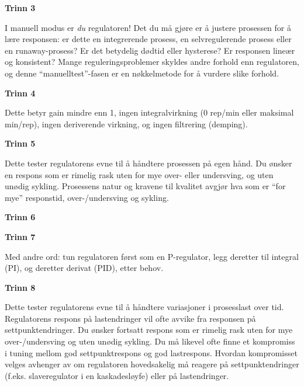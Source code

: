 \vskip 10pt

\noindent
{\bf Trinn 3}

 I manuell modus er {\it du} regulatoren! Det du må gjøre er å justere prosessen for å lære responsen: er dette en integrerende prosess, en selvregulerende prosess eller en runaway-prosess? Er det betydelig dødtid eller hysterese? Er responsen lineær og konsistent? Mange reguleringsproblemer skyldes andre forhold enn regulatoren, og denne ``manuelltest''-fasen er en nøkkelmetode for å vurdere slike forhold.

\vskip 10pt

\noindent
{\bf Trinn 4}

 Dette betyr gain mindre enn 1, ingen integralvirkning (0 rep/min eller maksimal min/rep), ingen deriverende virkning, og ingen filtrering (demping).

\vskip 10pt

\noindent
{\bf Trinn 5}

 Dette tester regulatorens evne til å håndtere prosessen på egen hånd. Du ønsker en respons som er rimelig rask uten for mye over- eller undersving, og uten unødig sykling. Prosessens natur og kravene til kvalitet avgjør hva som er ``for mye'' responstid, over-/undersving og sykling.

\vskip 10pt

\noindent
{\bf Trinn 6}


\vskip 10pt

\noindent
{\bf Trinn 7}

 Med andre ord: tun regulatoren først som en P-regulator, legg deretter til integral (PI), og deretter derivat (PID), etter behov.

\filbreak

\vskip 10pt

\noindent
{\bf Trinn 8}

 Dette tester regulatorens evne til å håndtere variasjoner i prosesslast over tid. Regulatorens respons på lastendringer vil ofte avvike fra responsen på settpunktendringer. Du ønsker fortsatt respons som er rimelig rask uten for mye over-/undersving og uten unødig sykling. Du må likevel ofte finne et kompromiss i tuning mellom god settpunktrespons og god lastrespons. Hvordan kompromisset velges avhenger av om regulatoren hovedsakelig må reagere på settpunktendringer (f.eks. slaveregulator i en kaskadesløyfe) eller på lastendringer.

